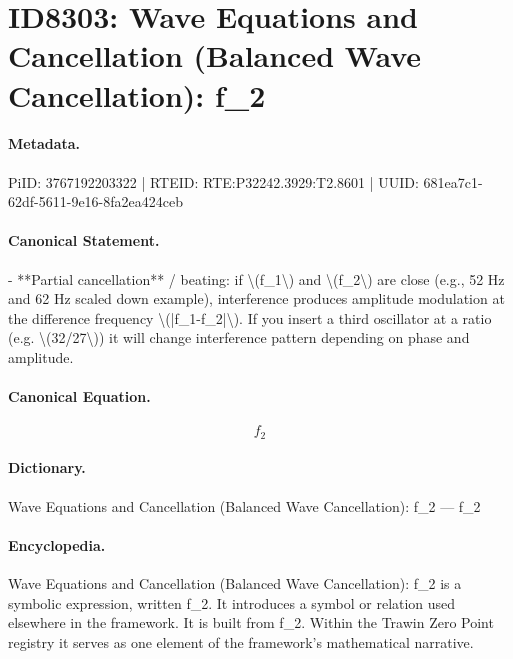 \section*{ID8303: Wave Equations and Cancellation (Balanced Wave Cancellation): f\_2}
\paragraph{Metadata.}
PiID: 3767192203322 | RTEID: RTE:P32242.3929:T2.8601 | UUID: 681ea7c1-62df-5611-9e16-8fa2ea424ceb

\paragraph{Canonical Statement.}
- **Partial cancellation** / beating: if \textbackslash{}(f\_1\textbackslash{}) and \textbackslash{}(f\_2\textbackslash{}) are close (e.g., 52 Hz and 62 Hz scaled down example), interference produces amplitude modulation at the difference frequency \textbackslash{}(|f\_1-f\_2|\textbackslash{}). If you insert a third oscillator at a ratio (e.g. \textbackslash{}(32/27\textbackslash{})) it will change interference pattern depending on phase and amplitude.

\paragraph{Canonical Equation.}
\[
f_2
\]

\paragraph{Dictionary.}
Wave Equations and Cancellation (Balanced Wave Cancellation): f\_2 — f\_2

\paragraph{Encyclopedia.}
Wave Equations and Cancellation (Balanced Wave Cancellation): f\_2 is a symbolic expression, written f\_2. It introduces a symbol or relation used elsewhere in the framework. It is built from f\_2. Within the Trawin Zero Point registry it serves as one element of the framework's mathematical narrative.
